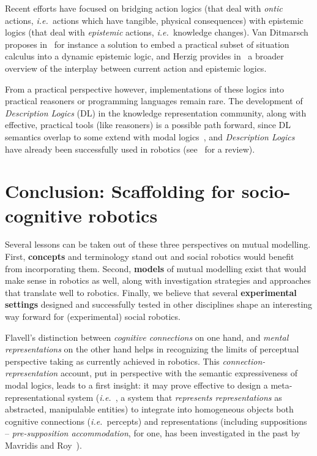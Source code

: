 \documentclass{sig-alternate}
\newcommand{\ie}{{\textit{i.e.~}}}
\begin{document}
Recent efforts have focused on bridging action logics (that deal with
\emph{ontic} actions, \ie actions which have tangible, physical consequences)
with epistemic logics (that deal with \emph{epistemic} actions, \ie knowledge
changes). Van Ditmarsch proposes in~\cite{ditmarsch2010from} for instance a
solution to embed a practical subset of situation calculus into a dynamic
epistemic logic, and Herzig provides in~\cite{herzig2014logics} a broader
overview of the interplay between current action and epistemic logics.

From a practical perspective however, implementations of these logics into
practical reasoners or programming languages remain rare. The development of
\emph{Description Logics} (DL) in the knowledge representation community, along
with effective, practical tools (like reasoners) is a possible path forward,
since DL semantics overlap to some extend with modal logics~\cite[chap.
4.2.2]{baader2003description}, and \emph{Description Logics} have already been
successfully used in robotics (see~\cite{lemaignan2012symbolic} for a review).


\section{Conclusion: Scaffolding for socio-cognitive robotics}

Several lessons can be taken out of these three perspectives on mutual modelling.
First, \textbf{concepts} and terminology stand out and social robotics would
benefit from incorporating them. Second, \textbf{models} of mutual modelling exist
that would make sense in robotics as well, along with investigation strategies
and approaches that translate well to robotics. Finally, we believe that several
\textbf{experimental settings} designed and successfully tested in other
disciplines shape an interesting way forward for (experimental) social robotics.

Flavell's distinction between \emph{cognitive connections} on one hand, and
\emph{mental representations} on the other hand helps in recognizing the limits
of perceptual perspective taking as currently achieved in robotics.  This
\emph{connection-representation} account, put in perspective with the semantic
expressiveness of modal logics, leads to a first insight: it may prove effective
to design a meta-representational system (\ie, a system that \emph{represents
representations} as abstracted, manipulable entities) to integrate into
homogeneous objects both cognitive connections (\ie percepts) and representations
(including suppositions -- \emph{pre-supposition accommodation}, for one, has
been investigated in the past by Mavridis and Roy~\cite{Mavridis2006}).
\end{document}

